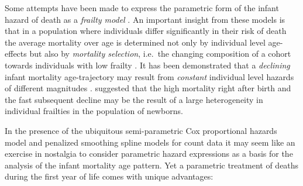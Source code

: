 \documentclass[smallextended]{svjour3} %
\begin{document}
Some attempts have been made to express the parametric form of the
infant hazard of death as a \emph{frailty model}
\citep{Vaupel1983, Hougaard1984, Vaupel1985}. An important insight from
these models is that in a population where individuals differ
significantly in their risk of death the average mortality over age is
determined not only by individual level age-effects but also by
\emph{mortality selection}, i.e.~the changing composition of a cohort
towards individuals with low frailty \citep{Vaupel1979}. It has been
demonstrated that a \emph{declining} infant mortality age-trajectory may
result from \emph{constant} individual level hazards of different
magnitudes \citep{Vaupel1983, Vaupel1985}. \citet{Hougaard1984}
suggested that the high mortality right after birth and the fast
subsequent decline may be the result of a large heterogeneity in
individual frailties in the population of newborns.

In the presence of the ubiquitous semi-parametric Cox proportional
hazards model \citep{Cox1972} and penalized smoothing spline models for
count data \citep{Eilers1996, Camarda2016} it may seem like an exercise
in nostalgia to consider parametric hazard expressions as a basis for
the analysis of the infant mortality age pattern. Yet a parametric
treatment of deaths during the first year of life comes with unique
advantages:
\end{document}
